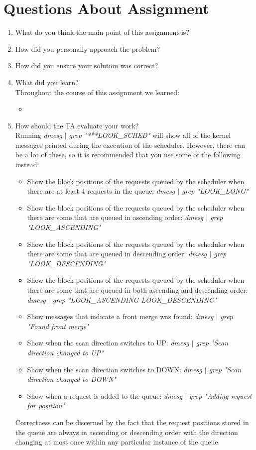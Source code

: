 \documentclass[onecolumn,draftclsnofoot, 10pt, compsoc]{IEEEtran}
\begin{document}
\section{Questions About Assignment}
	\begin{enumerate}
		\item What do you think the main point of this assignment is? \\
		\item How did you personally approach the problem? \\
		\item How did you ensure your solution was correct? \\
		\item What did you learn? \\
			Throughout the course of this assignment we learned:
			\begin{itemize}
				\item %
			\end{itemize}
		\item How should the TA evaluate your work? \\
			Running \textit{dmesg $|$ grep "***LOOK\_SCHED"} will show all of the kernel messages printed during the execution of the scheduler.
			However, there can be a lot of these, so it is recommended that you use some of the following instead:
			\begin{itemize}
				\item
					Show the block positions of the requests queued by the scheduler when there are at least 4 requests in the queue: \textit{dmesg $|$ grep "LOOK\_LONG"}
				\item 
					Show the block positions of the requests queued by the scheduler when there are some that are queued in ascending order: \textit{dmesg $|$ grep "LOOK\_ASCENDING"}
				\item 
					Show the block positions of the requests queued by the scheduler when there are some that are queued in descending order: \textit{dmesg $|$ grep "LOOK\_DESCENDING"}
				\item 
					Show the block positions of the requests queued by the scheduler when there are some that are queued in both ascending and descending order: \textit{dmesg $|$ grep "LOOK\_ASCENDING LOOK\_DESCENDING"}
				\item
					Show messages that indicate a front merge was found: \textit{dmesg $|$ grep "Found front merge"}
				\item 
					Show when the scan direction switches to UP: \textit{dmesg $|$ grep "Scan direction changed to UP"}
				\item 
					Show when the scan direction switches to DOWN: \textit{dmesg $|$ grep "Scan direction changed to DOWN"}
				\item
					Show when a request is added to the queue: \textit{dmesg $|$ grep "Adding request for position"}
			\end{itemize}
			Correctness can be discerned by the fact that the request positions stored in the queue are always in ascending or descending order with the direction changing at most once within any particular instance of the queue.
	\end{enumerate}
\end{document}
